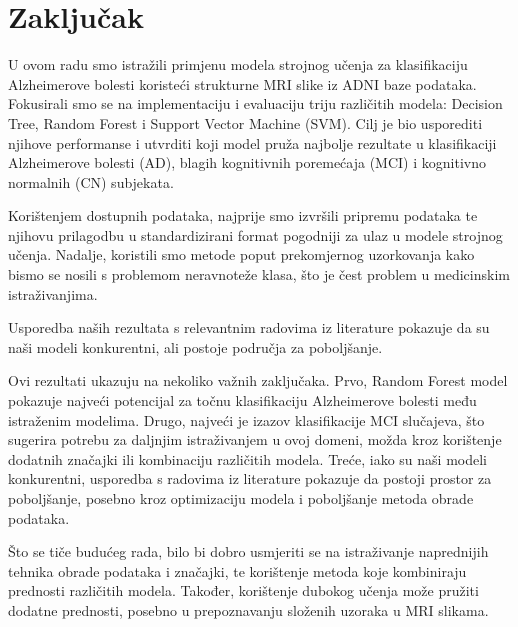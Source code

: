 \documentclass[zavrsnirad]{fer}
\begin{document}
\chapter{Zaključak}
\label{pog:zakljucak}
U ovom radu smo istražili primjenu modela strojnog učenja za klasifikaciju Alzheimerove bolesti koristeći strukturne MRI slike iz ADNI baze podataka. Fokusirali smo se na implementaciju i evaluaciju triju različitih modela: Decision Tree, Random Forest i Support Vector Machine (SVM). Cilj je bio usporediti njihove performanse i utvrditi koji model pruža najbolje rezultate u klasifikaciji Alzheimerove bolesti (AD), blagih kognitivnih poremećaja (MCI) i kognitivno normalnih (CN) subjekata.

Korištenjem dostupnih podataka, najprije smo izvršili pripremu podataka te njihovu prilagodbu u standardizirani format pogodniji za ulaz u modele strojnog učenja. Nadalje, koristili smo metode poput prekomjernog uzorkovanja kako bismo se nosili s problemom neravnoteže klasa, što je čest problem u medicinskim istraživanjima.

Usporedba naših rezultata s relevantnim radovima iz literature pokazuje da su naši modeli konkurentni, ali postoje područja za poboljšanje.

Ovi rezultati ukazuju na nekoliko važnih zaključaka. 
Prvo, Random Forest model pokazuje najveći potencijal za točnu klasifikaciju Alzheimerove bolesti među istraženim modelima. 
Drugo, najveći je izazov klasifikacije MCI slučajeva, što sugerira potrebu za daljnjim istraživanjem u ovoj domeni, možda kroz korištenje dodatnih značajki ili kombinaciju različitih modela. 
Treće, iako su naši modeli konkurentni, usporedba s radovima iz literature pokazuje da postoji prostor za poboljšanje, posebno kroz optimizaciju modela i poboljšanje metoda obrade podataka.

Što se tiče budućeg rada, bilo bi dobro usmjeriti se na istraživanje naprednijih tehnika obrade podataka i značajki, te korištenje metoda koje kombiniraju prednosti različitih modela. Također, korištenje dubokog učenja može pružiti dodatne prednosti, posebno u prepoznavanju složenih uzoraka u MRI slikama.




\end{document}
